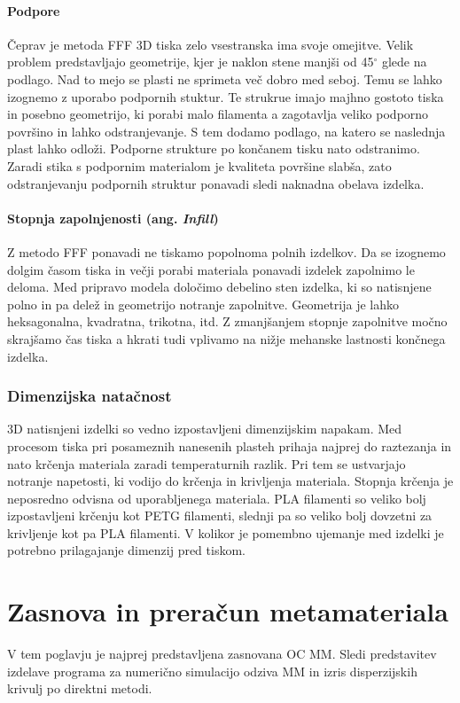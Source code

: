\documentclass[12pt]{report}
\begin{document}
\subsubsection{Podpore}
Čeprav je metoda \ac{FFF} 3D tiska zelo vsestranska ima svoje omejitve. Velik problem predstavljajo geometrije, kjer je naklon stene manjši od 45$^{\circ}$ glede na podlago. Nad to mejo se plasti ne sprimeta več dobro med seboj. Temu se lahko izognemo z uporabo podpornih stuktur. Te strukrue imajo majhno gostoto tiska in posebno geometrijo, ki porabi malo filamenta a zagotavlja veliko podporno površino in lahko odstranjevanje. 
S tem dodamo podlago, na katero se naslednja plast lahko odloži. Podporne strukture po končanem tisku nato odstranimo. Zaradi stika s podpornim materialom je kvaliteta površine slabša, zato
odstranjevanju podpornih struktur ponavadi sledi naknadna obelava izdelka.\cite{redwood20173d}

\subsubsection{Stopnja zapolnjenosti (ang. \emph{Infill})}
Z metodo \ac{FFF} ponavadi ne tiskamo popolnoma polnih izdelkov. Da se izognemo dolgim časom tiska in večji porabi materiala ponavadi izdelek zapolnimo le deloma. \cite{redwood20173d}
Med pripravo modela določimo debelino sten izdelka, ki so natisnjene polno in pa delež in geometrijo notranje zapolnitve. Geometrija je lahko heksagonalna, kvadratna, trikotna, itd. Z zmanjšanjem stopnje
zapolnitve močno skrajšamo čas tiska a hkrati tudi vplivamo na nižje mehanske lastnosti končnega izdelka.

\subsection{Dimenzijska natačnost}
3D natisnjeni izdelki so vedno izpostavljeni dimenzijskim napakam. Med procesom tiska pri posameznih nanesenih plasteh prihaja najprej do raztezanja in nato krčenja materiala zaradi temperaturnih
razlik. Pri tem se ustvarjajo notranje napetosti, ki vodijo do krčenja in krivljenja materiala. \cite{redwood20173d} Stopnja krčenja je neposredno odvisna od uporabljenega materiala. PLA filamenti so veliko bolj izpostavljeni krčenju kot PETG filamenti, slednji pa 
so veliko bolj dovzetni za krivljenje kot pa PLA filamenti. V kolikor je pomembno ujemanje med izdelki je potrebno prilagajanje dimenzij pred tiskom. 

\chapter{Zasnova in preračun metamateriala}
V tem poglavju je najprej predstavljena zasnovana \ac{OC} \ac{MM}. Sledi predstavitev izdelave programa za numerično simulacijo odziva \ac{MM} in izris disperzijskih krivulj po direktni
metodi.
\end{document}
